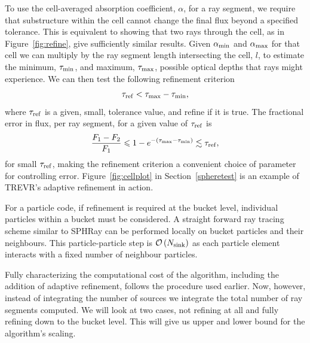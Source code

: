 \documentclass[fleq,usenatbib]{mnras}
\newcommand{\acro}{TREVR}
\newcommand{\bigO}[1]{\mathcal{O}\left(#1\right)}
\newcommand{\NK}{N_{\rm sink}}
\newcommand{\tr}{\tau_{\rm ref}}
\begin{document}
{To use the cell-averaged absorption coefficient, $\alpha$, for a ray segment,
we require that substructure within the cell cannot change the final flux
beyond a specified tolerance.
This is equivalent to showing that two rays through the cell,
as in Figure~\ref{fig:refine}, give sufficiently similar results.
Given $\alpha_{\rm min}$ and $\alpha_{\rm max}$ for that cell we can multiply
by the ray segment length intersecting the cell, 
$l$, to estimate the minimum, $\tau_{\rm min}$, and maximum, $\tau_{\rm max}$,
possible optical depths that rays might experience.
We can then test the following refinement criterion
\begin{equation}
\label{eqn:refcrit}
\tr < \tau_{\rm max} - \tau_{\rm min},
\end{equation}
where $\tr$ is a given, small, tolerance value, and refine if it is true. The 
fractional error in flux, per ray segment, for a given value of $\tr$ is
\begin{equation}
\label{eqn:reffrac}
\frac{F_1 - F_2}{F_1} \leq 1 - e^{-(\tau_{\rm max}-\tau_{\rm min})} 
\lesssim \tr,
\end{equation}
for small $\tr$, making the refinement criterion a convenient choice of 
parameter for controlling error. Figure~\ref{fig:cellplot} in Section~\ref{spheretest}
is an example of 
\acro{}'s adaptive refinement in action.

For a particle code, if refinement is required at the bucket level, individual particles 
within a bucket must be considered.  A straight forward ray tracing scheme 
similar to SPHRay \citep{altayEt08} can be performed locally on bucket particles and 
their neighbours.   This particle-particle step is $\bigO{\NK}$ as each particle element
interacts with a fixed number of neighbour particles.

Fully characterizing the computational cost of the algorithm, including the 
addition of adaptive refinement, follows the procedure used earlier. 
Now, however, instead of integrating the number of sources we integrate the 
total number of ray segments computed. We will look at two cases, not refining 
at all and fully refining down to the bucket level. This will give us upper 
and lower bound for the algorithm's scaling.

}
\end{document}
